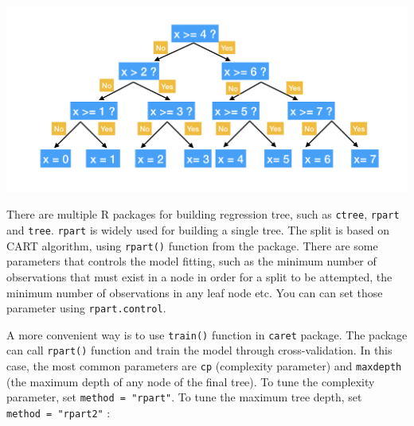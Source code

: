 \documentclass[
  12pt,
]{krantz}
\begin{document}
\includegraphics{images/BinaryTree.png}

There are multiple R packages for building regression tree, such as \texttt{ctree}, \texttt{rpart} and \texttt{tree}. \texttt{rpart} is widely used for building a single tree. The split is based on CART algorithm, using \texttt{rpart()} function from the package. There are some parameters that controls the model fitting, such as the minimum number of observations that must exist in a node in order for a split to be attempted, the minimum number of observations in any leaf node etc. You can can set those parameter using \texttt{rpart.control}.

A more convenient way is to use \texttt{train()} function in \texttt{caret} package. The package can call \texttt{rpart()} function and train the model through cross-validation. In this case, the most common parameters are \texttt{cp} (complexity parameter) and \texttt{maxdepth} (the maximum depth of any node of the final tree). To tune the complexity parameter, set \texttt{method\ =\ "rpart"}. To tune the maximum tree depth, set \texttt{method\ =\ "rpart2"} :
\end{document}
